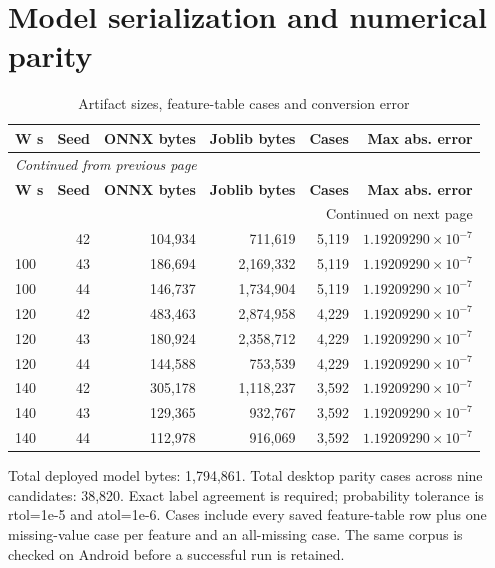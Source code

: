 \documentclass[10pt,a4paper]{article}
\begin{document}
\section{Model serialization and numerical parity}
\begingroup\small\setlength{\tabcolsep}{4pt}\renewcommand{\arraystretch}{1.12}
\begin{longtable}{@{}lrrrrr@{}}
\caption{Artifact sizes, feature-table cases and conversion error}\\
\toprule
\textbf{W s} & \textbf{Seed} & \textbf{ONNX bytes} & \textbf{Joblib bytes} & \textbf{Cases} & \textbf{Max abs. error} \\
\midrule\endfirsthead
\multicolumn{6}{l}{\small\itshape Continued from previous page}\\
\toprule
\textbf{W s} & \textbf{Seed} & \textbf{ONNX bytes} & \textbf{Joblib bytes} & \textbf{Cases} & \textbf{Max abs. error} \\
\midrule\endhead
\midrule\multicolumn{6}{r}{\small Continued on next page}\\\endfoot
\bottomrule\endlastfoot
100 & 42 & 104,934 & 711,619 & 5,119 & \(1.19209290\times10^{-7}\) \\
100 & 43 & 186,694 & 2,169,332 & 5,119 & \(1.19209290\times10^{-7}\) \\
100 & 44 & 146,737 & 1,734,904 & 5,119 & \(1.19209290\times10^{-7}\) \\
120 & 42 & 483,463 & 2,874,958 & 4,229 & \(1.19209290\times10^{-7}\) \\
120 & 43 & 180,924 & 2,358,712 & 4,229 & \(1.19209290\times10^{-7}\) \\
120 & 44 & 144,588 & 753,539 & 4,229 & \(1.19209290\times10^{-7}\) \\
140 & 42 & 305,178 & 1,118,237 & 3,592 & \(1.19209290\times10^{-7}\) \\
140 & 43 & 129,365 & 932,767 & 3,592 & \(1.19209290\times10^{-7}\) \\
140 & 44 & 112,978 & 916,069 & 3,592 & \(1.19209290\times10^{-7}\) \\
\end{longtable}\endgroup
Total deployed model bytes:\allowbreak{} 1,794,861. Total desktop parity cases across nine candidates:\allowbreak{} 38,820. Exact label agreement is required; probability tolerance is rtol=1e-5 and atol=1e-6. Cases include every saved feature-table row plus one missing-value case per feature and an all-missing case. The same corpus is checked on Android before a successful run is retained.
\end{document}
